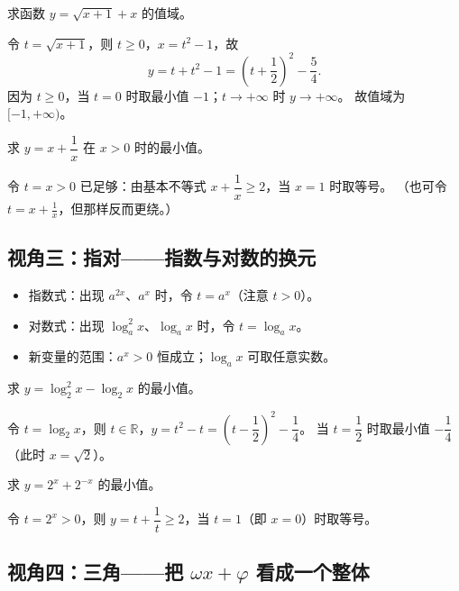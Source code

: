 \begin{explore}
\begin{example}
求函数 $y=\sqrt{x+1}+x$ 的值域。
\end{example}
\begin{solution}
令 $t=\sqrt{x+1}$，则 $t\geq0$，$x=t^2-1$，故
\[
  y=t+t^2-1=\left(t+\frac12\right)^2-\frac54.
\]
因为 $t\geq0$，当 $t=0$ 时取最小值 $-1$；$t\to+\infty$ 时 $y\to+\infty$。
故值域为 $[-1,+\infty)$。
\end{solution}

\begin{problem}
求 $y=x+\dfrac{1}{x}$ 在 $x>0$ 时的最小值。
\end{problem}
\begin{solution}
令 $t=x>0$ 已足够：由基本不等式 $x+\dfrac1x\geq2$，当 $x=1$ 时取等号。
（也可令 $t=x+\frac1x$，但那样反而更绕。）
\end{solution}

\subsection{视角三：指对——指数与对数的换元}

\begin{itemize}
  \item 指数式：出现 $a^{2x}$、$a^x$ 时，令 $t=a^x$（注意 $t>0$）。
  \item 对数式：出现 $\log_a^2 x$、$\log_a x$ 时，令 $t=\log_a x$。
  \item 新变量的范围：$a^x>0$ 恒成立；$\log_a x$ 可取任意实数。
\end{itemize}

\begin{example}
求 $y=\log_2^2 x-\log_2 x$ 的最小值。
\end{example}
\begin{solution}
令 $t=\log_2 x$，则 $t\in\mathbb{R}$，$y=t^2-t=\left(t-\dfrac12\right)^2-\dfrac14$。
当 $t=\dfrac12$ 时取最小值 $-\dfrac14$（此时 $x=\sqrt2$）。
\end{solution}

\begin{problem}
求 $y=2^x+2^{-x}$ 的最小值。
\end{problem}
\begin{solution}
令 $t=2^x>0$，则 $y=t+\dfrac1t\geq2$，当 $t=1$（即 $x=0$）时取等号。
\end{solution}

\subsection{视角四：三角——把 $\omega x+\varphi$ 看成一个整体}


\end{explore}
